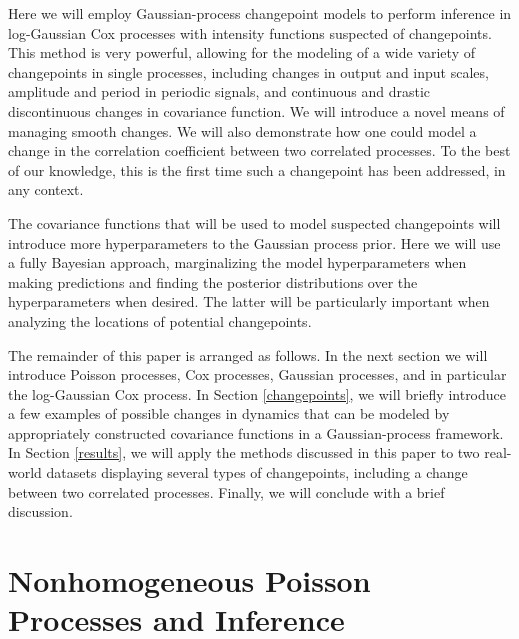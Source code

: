 \documentclass{article}
\begin{document}
Here we will employ Gaussian-process changepoint models to perform
inference in log-Gaussian Cox processes with intensity functions
suspected of changepoints.  This method is very powerful, allowing for
the modeling of a wide variety of changepoints in single processes,
including changes in output and input scales, amplitude and period in
periodic signals, and continuous and drastic discontinuous changes in
covariance function. We will introduce a novel means of managing smooth changes. We will also demonstrate how one could model a
change in the correlation coefficient between two correlated
processes.  To the best of our knowledge, this is the first time such
a changepoint has been addressed, in any context.

The covariance functions that will be used to model suspected
changepoints will introduce more hyperparameters to the Gaussian
process prior.  Here we will use a fully Bayesian approach,
marginalizing the model hyperparameters when making predictions and
finding the posterior distributions over the hyperparameters when
desired.  The latter will be particularly important when analyzing the
locations of potential changepoints.

The remainder of this paper is arranged as follows.  In the next
section we will introduce Poisson processes, Cox processes, Gaussian
processes, and in particular the log-Gaussian Cox process.  In Section
\ref{changepoints}, we will briefly introduce a few examples of
possible changes in dynamics that can be modeled by appropriately
constructed covariance functions in a Gaussian-process framework.  In
Section \ref{results}, we will apply the methods discussed in this
paper to two real-world datasets displaying several types of
changepoints, including a change between two correlated processes.
Finally, we will conclude with a brief discussion.

\section{Nonhomogeneous Poisson Processes and Inference}
\label{poisson}
\end{document}
